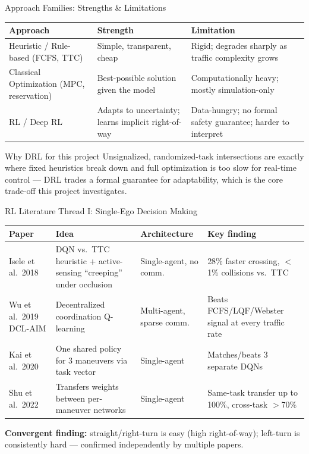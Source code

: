 \documentclass[aspectratio=169,10pt]{beamer}
\begin{document}
\begin{frame}{Approach Families: Strengths \& Limitations}
    \small
    \begin{table}
    \begin{tabularx}{\textwidth}{@{}l X X@{}}
        \toprule
        \textbf{Approach} & \textbf{Strength} & \textbf{Limitation} \\
        \midrule
        Heuristic / Rule-based (FCFS, TTC) & Simple, transparent, cheap & Rigid; degrades sharply as traffic complexity grows \\
        Classical Optimization (MPC, reservation) & Best-possible solution given the model & Computationally heavy; mostly simulation-only \\
        RL / Deep RL & Adapts to uncertainty; learns implicit right-of-way & Data-hungry; no formal safety guarantee; harder to interpret \\
        \bottomrule
    \end{tabularx}
    \end{table}
    \vspace{4pt}
    \begin{alertblock}{Why DRL for this project}
        Unsignalized, randomized-task intersections are exactly where fixed heuristics break down and full optimization is too slow for real-time control --- DRL trades a formal guarantee for adaptability, which is the core trade-off this project investigates.
    \end{alertblock}
\end{frame}

\begin{frame}{RL Literature Thread I: Single-Ego Decision Making}
    \scriptsize
    \begin{table}
    \begin{tabularx}{\textwidth}{@{}l X X X@{}}
        \toprule
        \textbf{Paper} & \textbf{Idea} & \textbf{Architecture} & \textbf{Key finding} \\
        \midrule
        Isele et al.\ 2018 \cite{isele2018navigating} & DQN vs.\ TTC heuristic + active-sensing ``creeping'' under occlusion & Single-agent, no comm. & 28\% faster crossing, $<$1\% collisions vs.\ TTC \\
        Wu et al.\ 2019 DCL-AIM \cite{wu2019dclaim} & Decentralized coordination Q-learning & Multi-agent, sparse comm. & Beats FCFS/LQF/Webster signal at every traffic rate \\
        Kai et al.\ 2020 \cite{kai2020multitask} & One shared policy for 3 maneuvers via task vector & Single-agent & Matches/beats 3 separate DQNs \\
        Shu et al.\ 2022 \cite{shu2022drivingtasks} & Transfers weights between per-maneuver networks & Single-agent & Same-task transfer up to 100\%, cross-task $>$70\% \\
        \bottomrule
    \end{tabularx}
    \end{table}
    \vspace{4pt}
    \textbf{Convergent finding:} straight/right-turn is easy (high right-of-way); \alert{left-turn is consistently hard} --- confirmed independently by multiple papers.
\end{frame}
\end{document}
